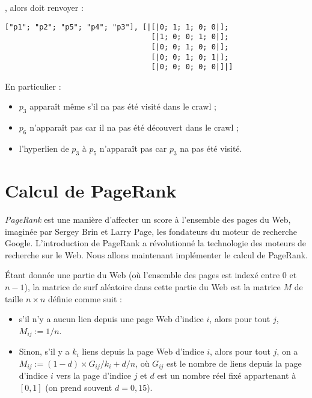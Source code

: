, alors  doit renvoyer :
\begin{lstlisting}
["p1"; "p2"; "p5"; "p4"; "p3"], [|[|0; 1; 1; 0; 0|]; 
                                  [|1; 0; 0; 1; 0|];
                                  [|0; 0; 1; 0; 0|];
                                  [|0; 0; 1; 0; 1|];
                                  [|0; 0; 0; 0; 0|]|]
\end{lstlisting}
En particulier :
\begin{itemize}
\item $p_3$ apparaît même s'il na pas été visité dans le crawl ;
\item $p_6$ n'apparaît pas car il na pas été découvert dans le crawl ;
\item l'hyperlien de $p_3$ à $p_5$ n'apparaît pas car $p_3$ na pas été visité.
\end{itemize}
\section{Calcul de PageRank}
{\it PageRank} est une manière d'affecter un score à l'ensemble des pages du Web, imaginée par Sergey Brin et Larry Page, les fondateurs du moteur de recherche Google. L'introduction de PageRank a révolutionné la technologie des moteurs de recherche sur le Web. Nous allons maintenant implémenter le calcul de PageRank.

Étant donnée une partie du Web (où l'ensemble des pages est indexé entre 0 et $n-1$), la matrice de surf aléatoire dans cette partie du Web est la matrice $M$ de taille $n\times n$ définie comme suit :
\begin{itemize}
\item s'il n'y a aucun lien depuis une page Web d'indice $i$, alors pour tout $j$, $M_{ij} := 1/n$.
\item  Sinon, s'il y a $k_i$ liens depuis la page Web d'indice $i$, alors pour tout $j$, on a $M_{ij} :=(1-d)\times G_{ij}/k_i+d/n$, où $G_{ij}$  est le nombre de liens depuis la page d'indice $i$ vers la page d'indice $j$ et $d$ est un nombre réel fixé appartenant à $[0, 1]$ (on prend souvent $d = 0,15$).
\end{itemize}

